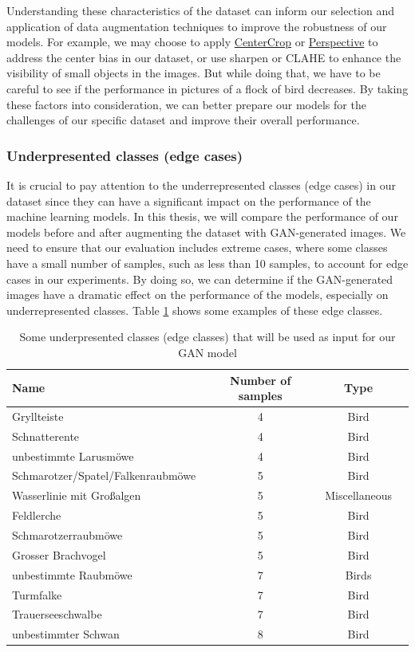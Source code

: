 Understanding these characteristics of the dataset can inform our selection and application of data augmentation techniques to improve the robustness of our models. For example, we may choose to apply \hyperref[CenterCrop]{CenterCrop} or \hyperref[Perspective]{Perspective} to address the center bias in our dataset, or use sharpen or CLAHE to enhance the visibility of small objects in the images. But while doing that, we have to be careful to see if the performance in pictures of a flock of bird decreases. By taking these factors into consideration, we can better prepare our models for the challenges of our specific dataset and improve their overall performance.

\subsubsection{Underpresented classes (edge cases)}
It is crucial to pay attention to the underrepresented classes (edge cases) in our dataset since they can have a significant impact on the performance of the machine learning models. In this thesis, we will compare the performance of our models before and after augmenting the dataset with GAN-generated images. We need to ensure that our evaluation includes extreme cases, where some classes have a small number of samples, such as less than 10 samples, to account for edge cases in our experiments. By doing so, we can determine if the GAN-generated images have a dramatic effect on the performance of the models, especially on underrepresented classes.  Table \ref{tab:edge-cases} shows some examples of these edge classes.

\begin{table}[ht]
\centering
\begin{tabular}{lccc}
    \toprule
    Name & Number of samples & Type \\ \midrule
        Gryllteiste  & 4 &  Bird \\
        Schnatterente & 4 &  Bird \\
        unbestimmte Larusmöwe &  4 & Bird  \\
        Schmarotzer/Spatel/Falkenraubmöwe & 5 & Bird  \\
        Wasserlinie mit Großalgen & 5 & Miscellaneous  \\
        Feldlerche & 5 & Bird  \\
        Schmarotzerraubmöwe & 5 & Bird  \\
        Grosser Brachvogel & 5 & Bird  \\
        unbestimmte Raubmöwe & 7 & Birds  \\
        Turmfalke & 7 & Bird  \\
        Trauerseeschwalbe & 7 & Bird  \\
        unbestimmter Schwan & 8 & Bird  \\
    \bottomrule
\end{tabular}
\caption{Some underpresented classes (edge classes) that will be used as input for our GAN model}
\label{tab:edge-cases} 
\end{table}

